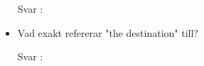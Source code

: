 \documentclass{article}
\begin{document}
\begin{itemize}
        \begin{description}
            \item[Svar :]
        \end{description}
        
          \item Vad exakt refererar "the destination" till?
    
        \begin{description}
            \item[Svar :]
        \end{description}

        
\end{itemize}
\end{document}
